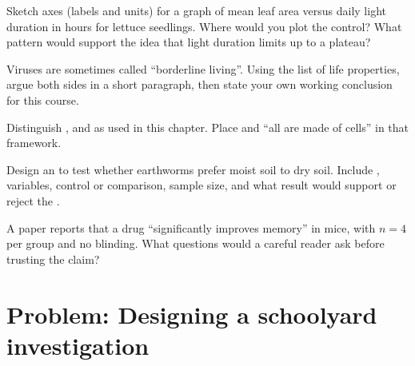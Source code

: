\begin{exercise}[$\star\star$]\label{exo:g10:scientific-biology:7}
Sketch axes (labels and units) for a graph of mean leaf area versus
daily light duration in hours for lettuce seedlings. Where would you
plot the control? What pattern would support the idea that light
duration limits  up to a plateau?
\end{exercise}

\begin{exercise}[$\star\star$]\label{exo:g10:scientific-biology:8}
Viruses are sometimes called ``borderline living''. Using the list of
life properties, argue both sides in a short paragraph, then state your
own working conclusion for this course.
\end{exercise}

\begin{exercise}[$\star\star$]\label{exo:g10:scientific-biology:9}
Distinguish \emph{}, \emph{} and \emph{} as used in
this chapter. Place  and ``all  are made of cells''
in that framework.
\end{exercise}

\begin{exercise}[$\star\star\star$]\label{exo:g10:scientific-biology:10}
Design an  to test whether earthworms prefer moist soil to
dry soil. Include , variables, control or comparison, sample
size, and what result would support or reject the .
\end{exercise}

\begin{exercise}[$\star\star\star$]\label{exo:g10:scientific-biology:11}
A paper reports that a drug ``significantly improves memory'' in mice,
with $n=4$ per group and no blinding. What questions would a careful
reader ask before trusting the claim?
\end{exercise}

\section{Problem: Designing a schoolyard investigation}

